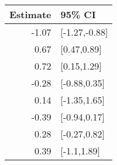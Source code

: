 \begin{tabular}{rl}
  \hline
Estimate & 95\% CI \\ 
  \hline
-1.07 & [-1.27,-0.88] \\ 
  0.67 & [0.47,0.89] \\ 
  0.72 & [0.15,1.29] \\ 
  -0.28 & [-0.88,0.35] \\ 
  0.14 & [-1.35,1.65] \\ 
  -0.39 & [-0.94,0.17] \\ 
  0.28 & [-0.27,0.82] \\ 
  0.39 & [-1.1,1.89] \\ 
   \hline
\end{tabular}

